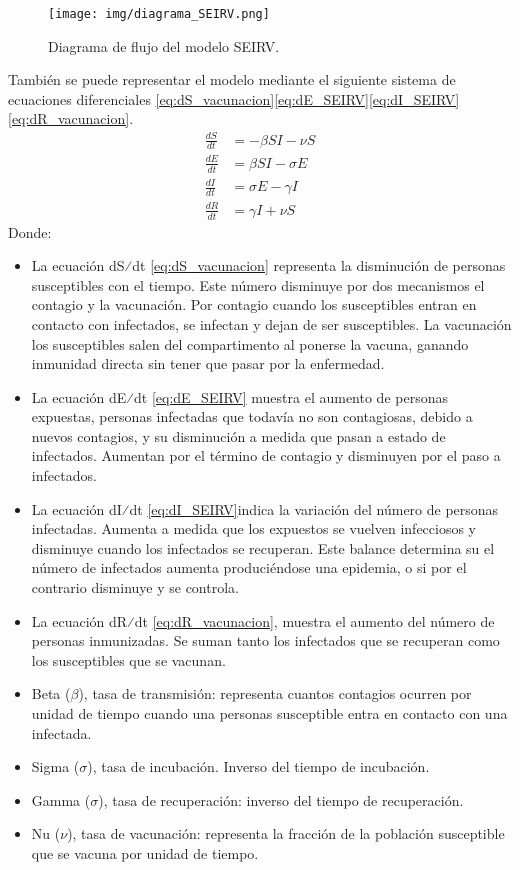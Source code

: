 \begin{figure}[H]
    \centering
    \texttt{[image: img/diagrama\_SEIRV.png]}
    \caption{Diagrama de flujo del modelo SEIRV.}
    \label{fig:eje SEIRV}
   
\end{figure}
También se puede representar el modelo mediante el siguiente sistema de ecuaciones diferenciales \eqref{eq:dS_vacunacion}\eqref{eq:dE_SEIRV}\eqref{eq:dI_SEIRV}\eqref{eq:dR_vacunacion}.
\begin{align}
\frac{dS}{dt} &= -\beta SI - \nu S \label{eq:dS_vacunacion} \\
\frac{dE}{dt} &= \beta SI - \sigma E \label{eq:dE_SEIRV} \\
\frac{dI}{dt} &= \sigma E - \gamma I \label{eq:dI_SEIRV} \\
\frac{dR}{dt} &= \gamma I + \nu S \label{eq:dR_vacunacion}
\end{align}
Donde:
\begin{itemize}
    \item 	La ecuación dS⁄dt \eqref{eq:dS_vacunacion} representa la disminución de personas susceptibles con el tiempo. Este número disminuye por dos mecanismos el contagio y la vacunación. Por contagio cuando los susceptibles entran en contacto con infectados, se infectan y dejan de ser susceptibles. La vacunación los susceptibles salen del compartimento al ponerse la vacuna, ganando inmunidad directa sin tener que pasar por la enfermedad.
    \item 	La ecuación dE⁄dt \eqref{eq:dE_SEIRV} muestra el aumento de personas expuestas, personas infectadas que todavía no son contagiosas, debido a nuevos contagios, y su disminución a medida que pasan a estado de infectados. Aumentan por el término de contagio y disminuyen por el paso a infectados.
    \item 	La ecuación dI⁄dt \eqref{eq:dI_SEIRV}indica la variación del número de personas infectadas. Aumenta a medida que los expuestos se vuelven infecciosos y disminuye cuando los infectados se recuperan. Este balance determina su el número de infectados aumenta produciéndose una epidemia, o si por el contrario disminuye y se controla.
    \item La ecuación dR⁄dt \eqref{eq:dR_vacunacion}, muestra el aumento del número de personas inmunizadas. Se suman tanto los infectados que se recuperan como los susceptibles que se vacunan.
    \item 	Beta ($\beta$), tasa de transmisión: representa cuantos contagios ocurren por unidad de tiempo cuando una personas susceptible entra en contacto con una infectada.
    \item Sigma ($\sigma$), tasa de incubación. Inverso del tiempo de incubación.
    \item Gamma ($\sigma$), tasa de recuperación: inverso del tiempo de recuperación.
    \item 	Nu ($\nu$), tasa de vacunación: representa la fracción de la población susceptible que se vacuna por unidad de tiempo.
\end{itemize}

